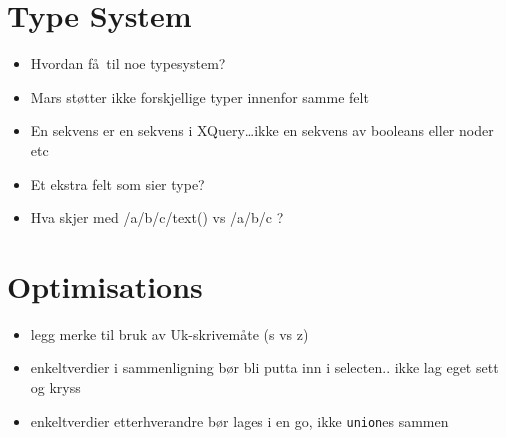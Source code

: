 \section{Type System}
\begin{itemize}
  \item Hvordan f\aa~til noe typesystem?
  \item Mars st\o tter ikke forskjellige typer innenfor samme felt
  \item En sekvens er en sekvens i XQuery\ldots ikke en sekvens av booleans
  eller noder etc
  \item Et ekstra felt som sier type?
  \item Hva skjer med /a/b/c/text() vs /a/b/c ?
\end{itemize}

\section{Optimisations}
\label{sect:discussion:optimisations}
\begin{itemize}
  \item legg merke til bruk av Uk-skrivem\aa te (s vs z)
  \item enkeltverdier i sammenligning b\o r bli putta inn i selecten.. ikke lag
  eget sett og kryss
  \item enkeltverdier etterhverandre b\o r lages i en go, ikke \texttt{union}es
  sammen
\end{itemize}